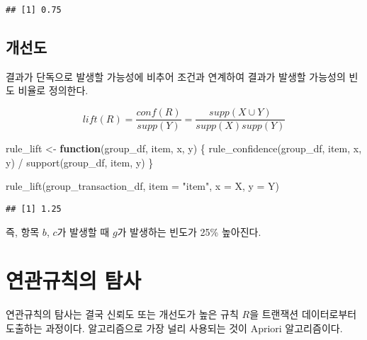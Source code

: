 \documentclass[
]{book}
\newenvironment{Shaded}{\begin{snugshade}}{\end{snugshade}}
\newcommand{\AttributeTok}[1]{\textcolor[rgb]{0.77,0.63,0.00}{#1}}
\newcommand{\ControlFlowTok}[1]{\textcolor[rgb]{0.13,0.29,0.53}{\textbf{#1}}}
\newcommand{\FunctionTok}[1]{\textcolor[rgb]{0.00,0.00,0.00}{#1}}
\newcommand{\NormalTok}[1]{#1}
\newcommand{\OtherTok}[1]{\textcolor[rgb]{0.56,0.35,0.01}{#1}}
\newcommand{\SpecialCharTok}[1]{\textcolor[rgb]{0.00,0.00,0.00}{#1}}
\newcommand{\StringTok}[1]{\textcolor[rgb]{0.31,0.60,0.02}{#1}}
\begin{document}
\begin{verbatim}
## [1] 0.75
\end{verbatim}

\hypertarget{association-rule-lift}{%
\subsection{개선도}\label{association-rule-lift}}

결과가 단독으로 발생할 가능성에 비추어 조건과 연계하여 결과가 발생할 가능성의 빈도 비율로 정의한다.

\begin{equation*}
lift(R) = \frac{conf(R)}{supp(Y)} = \frac{supp(X \cup Y)}{supp(X)supp(Y)}
\end{equation*}

\begin{Shaded}
\begin{Highlighting}[]
\NormalTok{rule\_lift }\OtherTok{\textless{}{-}} \ControlFlowTok{function}\NormalTok{(group\_df, item, x, y) \{}
  \FunctionTok{rule\_confidence}\NormalTok{(group\_df, item, x, y) }\SpecialCharTok{/} \FunctionTok{support}\NormalTok{(group\_df, item, y)}
\NormalTok{\}}
\end{Highlighting}
\end{Shaded}

\begin{Shaded}
\begin{Highlighting}[]
\FunctionTok{rule\_lift}\NormalTok{(group\_transaction\_df, }\AttributeTok{item =} \StringTok{"item"}\NormalTok{, }\AttributeTok{x =}\NormalTok{ X, }\AttributeTok{y =}\NormalTok{ Y)}
\end{Highlighting}
\end{Shaded}

\begin{verbatim}
## [1] 1.25
\end{verbatim}

즉, 항목 \(b\), \(c\)가 발생할 때 \(g\)가 발생하는 빈도가 25\% 높아진다.

\hypertarget{association-rule-exploration}{%
\section{연관규칙의 탐사}\label{association-rule-exploration}}

연관규칙의 탐사는 결국 신뢰도 또는 개선도가 높은 규칙 \(R\)을 트랜잭션 데이터로부터 도출하는 과정이다. 알고리즘으로 가장 널리 사용되는 것이 Apriori 알고리즘\citep{agrawal1994fast}이다.
\end{document}

